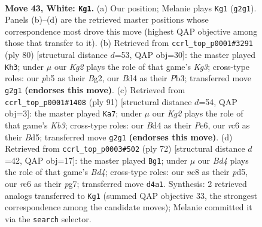\documentclass[11pt]{article}
\begin{document}
\clearpage

\begin{figure}[p]\centering
\begin{subfigure}{0.46\textwidth}\centering
\resizebox{\linewidth}{!}{%
\newchessgame
\chessboard[
  setfen={2n2k2/3R4/2r5/1p4p1/r2B4/4P1P1/b4PKP/4R3 w - - 4 43},
  showmover=false,
  pgfstyle=straightmove, color=movearrow, markmove={g2-g1}
]}
\caption{}
\end{subfigure}\hfill
\begin{subfigure}{0.46\textwidth}\centering
\resizebox{\linewidth}{!}{%
\newchessgame
\chessboard[
  setfen={8/5p1k/8/4p2p/1R2P2P/1Prb1PK1/6B1/8 w - - 1 41},
  showmover=false,
  pgfstyle=straightmove, color=movearrow, markmove={g3-h3}
]}
\caption{}
\end{subfigure}
\\[4pt]
\begin{subfigure}{0.46\textwidth}\centering
\resizebox{\linewidth}{!}{%
\newchessgame
\chessboard[
  setfen={8/6p1/1k2p2p/p1rb4/B3p3/4N1P1/1R1K1P1P/8 b - - 3 46},
  showmover=false,
  pgfstyle=straightmove, color=movearrow, markmove={b6-a7}
]}
\caption{}
\end{subfigure}\hfill
\begin{subfigure}{0.46\textwidth}\centering
\resizebox{\linewidth}{!}{%
\newchessgame
\chessboard[
  setfen={8/3k2pp/5p2/1bPp4/1r1B2P1/5PKP/3R4/8 w - - 11 37},
  showmover=false,
  pgfstyle=straightmove, color=movearrow, markmove={d4-g1}
]}
\caption{}
\end{subfigure}
\caption{\textbf{Move 43, White: \texttt{Kg1}.} (a) Our position; Melanie plays \texttt{Kg1} (\texttt{g2g1}). Panels (b)--(d) are the retrieved master positions whose correspondence most drove this move (highest QAP objective among those that transfer to it). (b) Retrieved from \texttt{ccrl\_top\_p0001\#3291} (ply 80) [structural distance $d$=53, QAP obj=30]: the master played \texttt{Kh3}; under $\mu$ our \emph{Kg2} plays the role of that game's \emph{Kg3}; cross-type roles: our \emph{p}b5 as their \emph{B}g2, our \emph{B}d4 as their \emph{P}b3; transferred move \texttt{g2g1} \textbf{(endorses this move)}. (c) Retrieved from \texttt{ccrl\_top\_p0001\#1408} (ply 91) [structural distance $d$=54, QAP obj=3]: the master played \texttt{Ka7}; under $\mu$ our \emph{Kg2} plays the role of that game's \emph{Kb3}; cross-type roles: our \emph{B}d4 as their \emph{P}e6, our \emph{r}c6 as their \emph{B}d5; transferred move \texttt{g2g1} \textbf{(endorses this move)}. (d) Retrieved from \texttt{ccrl\_top\_p0003\#502} (ply 72) [structural distance $d$=42, QAP obj=17]: the master played \texttt{Bg1}; under $\mu$ our \emph{Bd4} plays the role of that game's \emph{Bd4}; cross-type roles: our \emph{n}c8 as their \emph{p}d5, our \emph{r}c6 as their \emph{p}g7; transferred move \texttt{d4a1}. Synthesis: 2 retrieved analogs transferred to \texttt{Kg1} (summed QAP objective 33, the strongest correspondence among the candidate moves); Melanie committed it via the \texttt{search} selector.}
\label{fig:thought-m84}
\end{figure}
\end{document}
